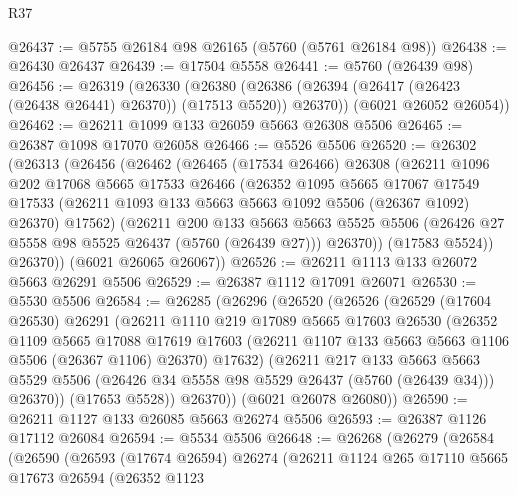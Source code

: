 \begin{lexlean}{R37}
\begin{coremodule}
@26437 := @5755 @26184 @98 @26165 (@5760 (@5761 @26184 @98))
@26438 := @26430 @26437
@26439 := @17504 @5558
@26441 := @5760 (@26439 @98)
@26456 := @26319
    (@26330
      (@26380 (@26386 (@26394 (@26417 (@26423 (@26438 @26441) @26370)) (@17513 @5520)) @26370))
      (@6021 @26052 @26054))
@26462 := @26211 @1099 @133 @26059 @5663 @26308 @5506
@26465 := @26387 @1098 @17070 @26058
@26466 := @5526 @5506
@26520 := @26302
    (@26313
      (@26456
        (@26462
          (@26465
            (@17534 @26466)
            @26308
            (@26211
              @1096
              @202
              @17068
              @5665
              @17533
              @26466
              (@26352
                @1095
                @5665
                @17067
                @17549
                @17533
                (@26211 @1093 @133 @5663 @5663 @1092 @5506 (@26367 @1092) @26370)
                @17562)
              (@26211
                @200
                @133
                @5663
                @5663
                @5525
                @5506
                (@26426 @27 @5558 @98 @5525 @26437 (@5760 (@26439 @27)))
                @26370))
            (@17583 @5524))
          @26370))
      (@6021 @26065 @26067))
@26526 := @26211 @1113 @133 @26072 @5663 @26291 @5506
@26529 := @26387 @1112 @17091 @26071
@26530 := @5530 @5506
@26584 := @26285
    (@26296
      (@26520
        (@26526
          (@26529
            (@17604 @26530)
            @26291
            (@26211
              @1110
              @219
              @17089
              @5665
              @17603
              @26530
              (@26352
                @1109
                @5665
                @17088
                @17619
                @17603
                (@26211 @1107 @133 @5663 @5663 @1106 @5506 (@26367 @1106) @26370)
                @17632)
              (@26211
                @217
                @133
                @5663
                @5663
                @5529
                @5506
                (@26426 @34 @5558 @98 @5529 @26437 (@5760 (@26439 @34)))
                @26370))
            (@17653 @5528))
          @26370))
      (@6021 @26078 @26080))
@26590 := @26211 @1127 @133 @26085 @5663 @26274 @5506
@26593 := @26387 @1126 @17112 @26084
@26594 := @5534 @5506
@26648 := @26268
    (@26279
      (@26584
        (@26590
          (@26593
            (@17674 @26594)
            @26274
            (@26211
              @1124
              @265
              @17110
              @5665
              @17673
              @26594
              (@26352
                @1123

\end{coremodule}
\end{lexlean}
